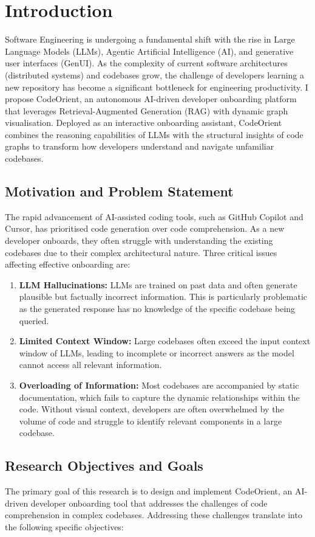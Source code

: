 \chapter{Introduction}
Software Engineering is undergoing a fundamental shift with the rise in Large Language Models (LLMs), Agentic Artificial Intelligence (AI), and generative user interfaces (GenUI). As the complexity of current software architectures (distributed systems) and codebases grow, the challenge of developers learning a new repository has become a significant bottleneck for engineering productivity. I propose CodeOrient, an autonomous AI-driven developer onboarding platform that leverages Retrieval-Augmented Generation (RAG) with dynamic graph visualisation. Deployed as an interactive onboarding assistant, CodeOrient combines the reasoning capabilities of LLMs with the structural insights of code graphs to transform how developers understand and navigate unfamiliar codebases.
\section{Motivation and Problem Statement}
The rapid advancement of AI-assisted coding tools, such as GitHub Copilot and Cursor, has prioritised code generation over code comprehension. As a new developer onboards, they often struggle with understanding the existing codebases due to their complex architectural nature. Three critical issues affecting effective onboarding are:

\begin{enumerate}
    \item \textbf{LLM Hallucinations:} LLMs are trained on past data and often generate plausible but factually incorrect information. This is particularly problematic as the generated response has no knowledge of the specific codebase being queried.
    \item \textbf{Limited Context Window:} Large codebases often exceed the input context window of LLMs, leading to incomplete or incorrect answers as the model cannot access all relevant information.
    \item \textbf{Overloading of Information:} Most codebases are accompanied by static documentation, which fails to capture the dynamic relationships within the code. Without visual context, developers are often overwhelmed by the volume of code and struggle to identify relevant components in a large codebase.
\end{enumerate}

\section{Research Objectives and Goals}
The primary goal of this research is to design and implement CodeOrient, an AI-driven developer onboarding tool that addresses the challenges of code comprehension in complex codebases. Addressing these challenges translate into the following specific objectives:

